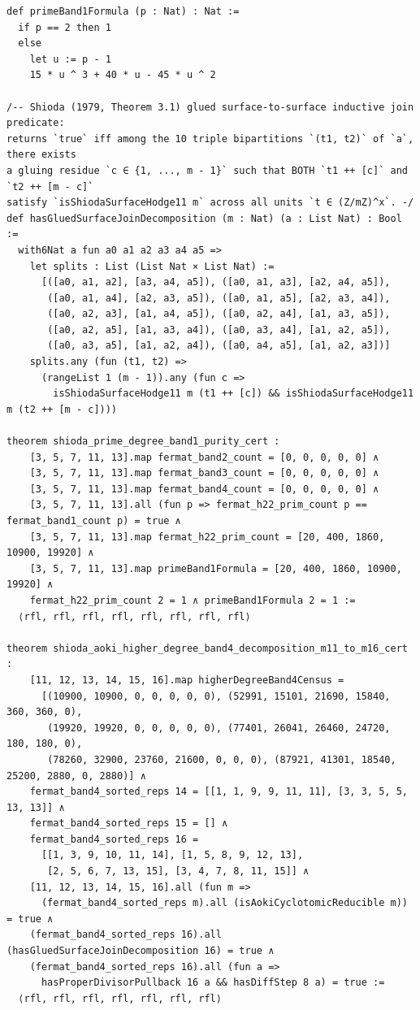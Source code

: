 \documentclass[11pt,a4paper]{article}
\begin{document}
\begin{lstlisting}[caption={Prime-degree Band-1 purity and glued surface-join Band-4 decomposition in \texttt{HigherDegreeSporadicBand4.lean}.}]
def primeBand1Formula (p : Nat) : Nat :=
  if p == 2 then 1
  else
    let u := p - 1
    15 * u ^ 3 + 40 * u - 45 * u ^ 2

/-- Shioda (1979, Theorem 3.1) glued surface-to-surface inductive join predicate:
returns `true` iff among the 10 triple bipartitions `(t1, t2)` of `a`, there exists
a gluing residue `c ∈ {1, ..., m - 1}` such that BOTH `t1 ++ [c]` and `t2 ++ [m - c]`
satisfy `isShiodaSurfaceHodge11 m` across all units `t ∈ (Z/mZ)^x`. -/
def hasGluedSurfaceJoinDecomposition (m : Nat) (a : List Nat) : Bool :=
  with6Nat a fun a0 a1 a2 a3 a4 a5 =>
    let splits : List (List Nat × List Nat) :=
      [([a0, a1, a2], [a3, a4, a5]), ([a0, a1, a3], [a2, a4, a5]),
       ([a0, a1, a4], [a2, a3, a5]), ([a0, a1, a5], [a2, a3, a4]),
       ([a0, a2, a3], [a1, a4, a5]), ([a0, a2, a4], [a1, a3, a5]),
       ([a0, a2, a5], [a1, a3, a4]), ([a0, a3, a4], [a1, a2, a5]),
       ([a0, a3, a5], [a1, a2, a4]), ([a0, a4, a5], [a1, a2, a3])]
    splits.any (fun (t1, t2) =>
      (rangeList 1 (m - 1)).any (fun c =>
        isShiodaSurfaceHodge11 m (t1 ++ [c]) && isShiodaSurfaceHodge11 m (t2 ++ [m - c])))

theorem shioda_prime_degree_band1_purity_cert :
    [3, 5, 7, 11, 13].map fermat_band2_count = [0, 0, 0, 0, 0] ∧
    [3, 5, 7, 11, 13].map fermat_band3_count = [0, 0, 0, 0, 0] ∧
    [3, 5, 7, 11, 13].map fermat_band4_count = [0, 0, 0, 0, 0] ∧
    [3, 5, 7, 11, 13].all (fun p => fermat_h22_prim_count p == fermat_band1_count p) = true ∧
    [3, 5, 7, 11, 13].map fermat_h22_prim_count = [20, 400, 1860, 10900, 19920] ∧
    [3, 5, 7, 11, 13].map primeBand1Formula = [20, 400, 1860, 10900, 19920] ∧
    fermat_h22_prim_count 2 = 1 ∧ primeBand1Formula 2 = 1 :=
  ⟨rfl, rfl, rfl, rfl, rfl, rfl, rfl, rfl⟩

theorem shioda_aoki_higher_degree_band4_decomposition_m11_to_m16_cert :
    [11, 12, 13, 14, 15, 16].map higherDegreeBand4Census =
      [(10900, 10900, 0, 0, 0, 0, 0), (52991, 15101, 21690, 15840, 360, 360, 0),
       (19920, 19920, 0, 0, 0, 0, 0), (77401, 26041, 26460, 24720, 180, 180, 0),
       (78260, 32900, 23760, 21600, 0, 0, 0), (87921, 41301, 18540, 25200, 2880, 0, 2880)] ∧
    fermat_band4_sorted_reps 14 = [[1, 1, 9, 9, 11, 11], [3, 3, 5, 5, 13, 13]] ∧
    fermat_band4_sorted_reps 15 = [] ∧
    fermat_band4_sorted_reps 16 =
      [[1, 3, 9, 10, 11, 14], [1, 5, 8, 9, 12, 13],
       [2, 5, 6, 7, 13, 15], [3, 4, 7, 8, 11, 15]] ∧
    [11, 12, 13, 14, 15, 16].all (fun m =>
      (fermat_band4_sorted_reps m).all (isAokiCyclotomicReducible m)) = true ∧
    (fermat_band4_sorted_reps 16).all (hasGluedSurfaceJoinDecomposition 16) = true ∧
    (fermat_band4_sorted_reps 16).all (fun a =>
      hasProperDivisorPullback 16 a && hasDiffStep 8 a) = true :=
  ⟨rfl, rfl, rfl, rfl, rfl, rfl, rfl⟩


\end{lstlisting}
\end{document}
